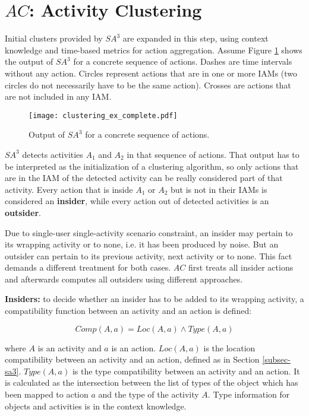 \section{$AC$: Activity Clustering}
\label{sec:clustering:ac}

Initial clusters provided by $SA^3$ are expanded in this step, using context knowledge and time-based metrics for action aggregation. Assume Figure \ref{fig-initial-clusters} shows the output of $SA^3$ for a concrete sequence of actions. Dashes are time intervals without any action. Circles represent actions that are in one or more IAMs (two circles do not necessarily have to be the same action). Crosses are actions that are not included in any IAM. 

\begin{figure}[htbp]%
\centering
\texttt{[image: clustering\_ex\_complete.pdf]}
    \caption{Output of $SA^3$ for a concrete sequence of actions.}
    \label{fig-initial-clusters}
\end{figure}

$SA^3$ detects activities $A_1$ and $A_2$ in that sequence of actions. That output has to be interpreted as the initialization of a clustering algorithm, so only actions that are in the IAM of the detected activity can be really considered part of that activity. Every action that is inside $A_1$ or $A_2$ but is not in their IAMs is considered an \textbf{insider}, while every action out of detected activities is an \textbf{outsider}.

Due to single-user single-activity scenario constraint, an insider may pertain to its wrapping activity or to none, i.e. it has been produced by noise. But an outsider can pertain to its previous activity, next activity or to none. This fact demands a different treatment for both cases. $AC$ first treats all insider actions and afterwards computes all outsiders using different approaches.

\textbf{Insiders:} to decide whether an insider has to be added to its wrapping activity, a compatibility function between an activity and an action is defined:

\begin{equation}
 Comp(A, a) = Loc(A, a) \wedge Type(A, a)
\end{equation}

\noindent where $A$ is an activity and $a$ is an action. $Loc(A, a)$ is the location compatibility between an activity and an action, defined as in Section \ref{subsec-sa3}. $Type(A, a)$ is the type compatibility between an activity and an action. It is calculated as the intersection between the list of types of the object which has been mapped to action $a$ and the type of the activity $A$. Type information for objects and activities is in the context knowledge. 

